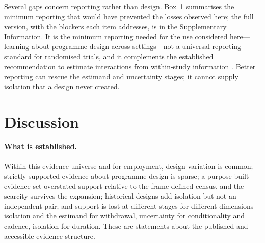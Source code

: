 \documentclass[11pt]{article}
\begin{document}
Several gaps concern reporting rather than design. Box~1 summarises the minimum reporting that would have prevented the losses observed here; the full version, with the blockers each item addresses, is in the Supplementary Information. It is the minimum reporting needed for the use considered here---learning about programme design across settings---not a universal reporting standard for randomised trials, and it complements the established recommendation to estimate interactions from within-study information \citep{riley2020}. Better reporting can rescue the estimand and uncertainty stages; it cannot supply isolation that a design never created.

\begin{center}
\end{center}

\section{Discussion}

\paragraph{What is established.} Within this evidence universe and for employment, design variation is common; strictly supported evidence about programme design is sparse; a purpose-built evidence set overstated support relative to the frame-defined census, and the scarcity survives the expansion; historical designs add isolation but not an independent pair; and support is lost at different stages for different dimensions---isolation and the estimand for withdrawal, uncertainty for conditionality and cadence, isolation for duration. These are statements about the published and accessible evidence structure.
\end{document}

